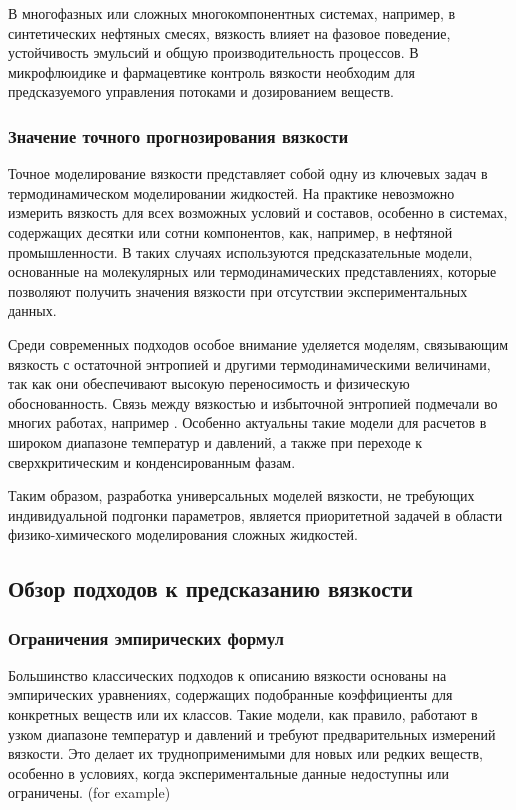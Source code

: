 \documentclass[a4paper,12pt]{article}
\begin{document}
В многофазных или сложных многокомпонентных системах, например, в синтетических нефтяных смесях, вязкость влияет на фазовое поведение, устойчивость эмульсий и общую производительность процессов. В микрофлюидике и фармацевтике контроль вязкости необходим для предсказуемого управления потоками и дозированием веществ.

    \subsubsection{Значение точного прогнозирования вязкости}

Точное моделирование вязкости представляет собой одну из ключевых задач в термодинамическом моделировании жидкостей. На практике невозможно измерить вязкость для всех возможных условий и составов, особенно в системах, содержащих десятки или сотни компонентов, как, например, в нефтяной промышленности. В таких случаях используются предсказательные модели, основанные на молекулярных или термодинамических представлениях, которые позволяют получить значения вязкости при отсутствии экспериментальных данных.

Среди современных подходов особое внимание уделяется моделям, связывающим вязкость с остаточной энтропией и другими термодинамическими величинами, так как они обеспечивают высокую переносимость и физическую обоснованность. Связь между вязкостью и избыточной энтропией подмечали во многих работах, например \cite{taib2020residual}. Особенно актуальны такие модели для расчетов в широком диапазоне температур и давлений, а также при переходе к сверхкритическим и конденсированным фазам.

Таким образом, разработка универсальных моделей вязкости, не требующих индивидуальной подгонки параметров, является приоритетной задачей в области физико-химического моделирования сложных жидкостей.

  \subsection{Обзор подходов к предсказанию вязкости}

    \subsubsection{Ограничения эмпирических формул}
Большинство классических подходов к описанию вязкости основаны на эмпирических уравнениях, содержащих подобранные коэффициенты для конкретных веществ или их классов. Такие модели, как правило, работают в узком диапазоне температур и давлений и требуют предварительных измерений вязкости. Это делает их трудноприменимыми для новых или редких веществ, особенно в условиях, когда экспериментальные данные недоступны или ограничены. (for example)
\end{document}
